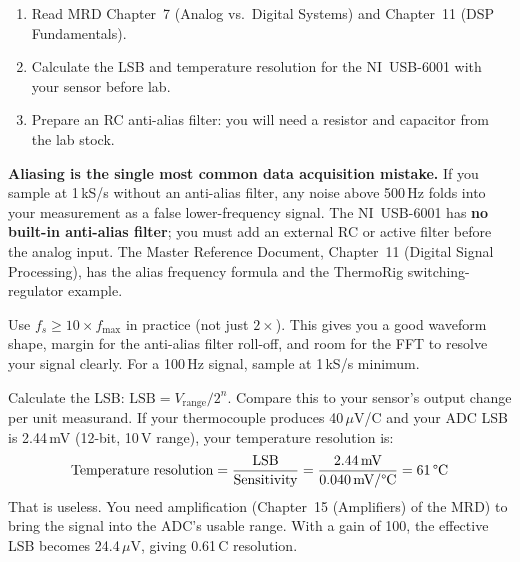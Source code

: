 \documentclass[11pt,letterpaper]{article}
\begin{document}
\begin{tcolorbox}[colback=minesblue!3, colframe=minesblue!40, boxrule=0.5pt, arc=2pt, left=6pt, right=6pt, top=3pt, bottom=3pt, fonttitle=\small\bfseries\color{minesblue}, title={Before You Start: Module 4}]
\small
\begin{enumerate}[nosep,leftmargin=*]
\item Read MRD Chapter~7 (Analog vs.\ Digital Systems) and Chapter~11 (DSP Fundamentals).
\item Calculate the LSB and temperature resolution for the NI~USB-6001 with your sensor before lab.
\item Prepare an RC anti-alias filter: you will need a resistor and capacitor from the lab stock.
\end{enumerate}
\end{tcolorbox}

\begin{warnbox}
\textbf{Aliasing is the single most common data acquisition mistake.} If you sample at 1\,kS/s without an anti-alias filter, any noise above 500\,Hz folds into your measurement as a false lower-frequency signal. The NI~USB-6001 has \textbf{no built-in anti-alias filter}; you must add an external RC or active filter before the analog input. The Master Reference Document, Chapter~11 (Digital Signal Processing), has the alias frequency formula and the ThermoRig switching-regulator example.
\end{warnbox}

\begin{tipbox}
Use $f_s \geq 10 \times f_{\max}$ in practice (not just $2\times$). This gives you a good waveform shape, margin for the anti-alias filter roll-off, and room for the FFT to resolve your signal clearly. For a 100\,Hz signal, sample at 1\,kS/s minimum.
\end{tipbox}

\begin{faqbox}
Calculate the LSB: $\text{LSB} = V_{\text{range}} / 2^n$. Compare this to your sensor's output change per unit measurand. If your thermocouple produces 40\,$\mu$V/\textdegree{}C and your ADC LSB is 2.44\,mV (12-bit, 10\,V range), your temperature resolution is:
\[
\text{Temperature resolution} = \frac{\text{LSB}}{\text{Sensitivity}} = \frac{2.44\,\text{mV}}{0.040\,\text{mV/\textdegree{}C}} = 61\,\text{\textdegree{}C}
\]
That is useless. You need amplification (Chapter~15 (Amplifiers) of the MRD) to bring the signal into the ADC's usable range. With a gain of 100, the effective LSB becomes 24.4\,$\mu$V, giving 0.61\,\textdegree{}C resolution.
\end{faqbox}
\end{document}
